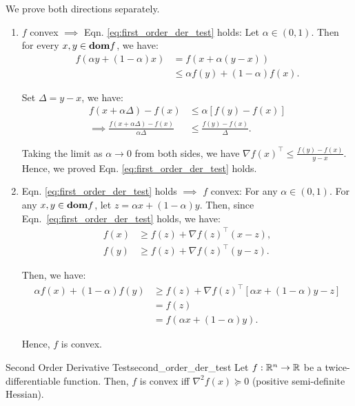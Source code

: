 \begin{proof*}
	We prove both directions separately.
	\begin{enumerate}[label=(\roman*)]
		\item $f$ convex $\implies$ Eqn. \eqref{eq:first_order_der_test} holds: Let $\alpha\in(0,1)$. Then for every $x, y\in{\mathrm{\bf dom}} f$, we have:
		\begin{align*}
			f(\alpha y + (1-\alpha)x) &= f(x+\alpha(y-x)) \\
			 	&\le \alpha f(y) + (1-\alpha)f(x).
		\end{align*} 

		\noindent Set $\Delta=y-x$, we have:
		\begin{align*}
			f(x+\alpha\Delta) - f(x) &\le \alpha [f(y) - f(x)] \\
			\implies
			\frac{f(x+\alpha\Delta) - f(x)}{\alpha\Delta} &\le \frac{f(y) - f(x)}{\Delta}.
		\end{align*}

		\noindent Taking the limit as $\alpha\to 0$ from both sides, we have $\nabla f(x)^\top\le \frac{f(y)-f(x)}{y-x}$. Hence, we proved Eqn. \eqref{eq:first_order_der_test} holds.

		\item Eqn. \eqref{eq:first_order_der_test} holds $\implies$ $f$ convex: For any $\alpha\in(0,1)$. For any $x, y\in{\mathrm{\bf dom}} f$, let $z=\alpha x + (1-\alpha)y$. Then, since Eqn.~\eqref{eq:first_order_der_test} holds, we have:
		\begin{align*}
			f(x) &\ge f(z) + \nabla f(z)^\top (x-z), \\
			f(y) &\ge f(z) + \nabla f(z)^\top (y-z).
		\end{align*} 

		\noindent Then, we have:
		\begin{align*}
			\alpha f(x) + (1-\alpha) f(y) &\ge f(z) + \nabla f(z)^\top [\alpha x + (1-\alpha)y - z] \\
			&= f(z) \\
			&= f(\alpha x + (1-\alpha)y).
		\end{align*} 

		\noindent Hence, $f$ is convex.
	\end{enumerate} 	
\end{proof*} 

\begin{proposition}{Second Order Derivative Test}{second_order_der_test}
	Let $f:\mathbb{R}^n\to\mathbb{R}$ be a twice-differentiable function. Then, $f$ is convex iff $\nabla^2 f(x)\succeq	0$ (positive semi-definite Hessian).
\end{proposition} 

\begin{proof*}
	
\end{proof*} 


